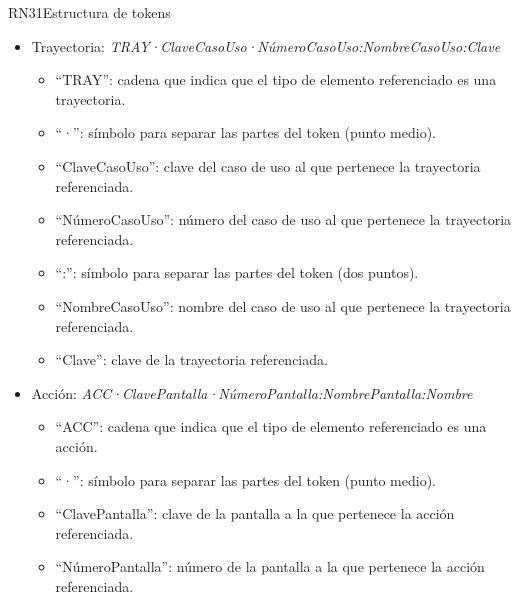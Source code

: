 \begin{BusinessRule}{RN31}{Estructura de tokens}
{\begin{itemize}
\begin{itemize}
					\item ``·'': símbolo para separar las partes del token (punto medio).
					\item ``ClaveCasoUso'': clave del caso de uso al que pertenece el paso referenciado.
					\item ``NúmeroCasoUso'': número del caso de uso al que pertenece el paso referenciado.
					\item ``:'': símbolo para separar las partes del token (dos puntos).
					\item ``NombreCasoUso'': nombre del caso de uso al que pertenece el paso referenciado.
					\item ``ClaveTrayectoria'': clave de la trayectoria a la que pertenece el paso referenciado.
					\item ``Número'': número del paso referenciado.
				\end{itemize}
			\item Trayectoria: {\it TRAY·ClaveCasoUso·NúmeroCasoUso:NombreCasoUso:Clave}
				\begin{itemize}
					\item ``TRAY'': cadena que indica que el tipo de elemento referenciado es una trayectoria.
					\item ``·'': símbolo para separar las partes del token (punto medio).
					\item ``ClaveCasoUso'': clave del caso de uso al que pertenece la trayectoria referenciada.
					\item ``NúmeroCasoUso'': número del caso de uso al que pertenece la trayectoria referenciada.
					\item ``:'': símbolo para separar las partes del token (dos puntos).
					\item ``NombreCasoUso'': nombre del caso de uso al que pertenece la trayectoria referenciada.
					\item ``Clave'': clave de la trayectoria referenciada.									
				\end{itemize}
			\item Acción: {\it ACC·ClavePantalla·NúmeroPantalla:NombrePantalla:Nombre}
				\begin{itemize}
					\item ``ACC'': cadena que indica que el tipo de elemento referenciado es una acción.
					\item ``·'': símbolo para separar las partes del token (punto medio).
					\item ``ClavePantalla'': clave de la pantalla a la que pertenece la acción referenciada.
					\item ``NúmeroPantalla'': número de la pantalla a la que pertenece la acción referenciada.

\end{itemize}
\end{itemize}}
\end{BusinessRule}
